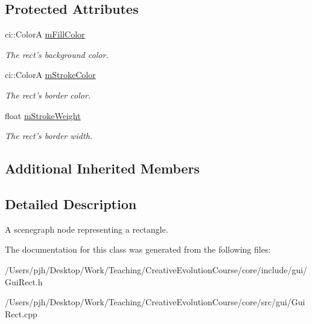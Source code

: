 \subsection*{Protected Attributes}
\begin{DoxyCompactItemize}
\item 
\hypertarget{class_gui_rect_a9c8999120a4fb5f654623195772a3988}{ci\-::\-Color\-A \hyperlink{class_gui_rect_a9c8999120a4fb5f654623195772a3988}{m\-Fill\-Color}}\label{class_gui_rect_a9c8999120a4fb5f654623195772a3988}

\begin{DoxyCompactList}\small\item\em The rect's background color. \end{DoxyCompactList}\item 
\hypertarget{class_gui_rect_a43b971fa2b7cf4afcfe476d693ba82a5}{ci\-::\-Color\-A \hyperlink{class_gui_rect_a43b971fa2b7cf4afcfe476d693ba82a5}{m\-Stroke\-Color}}\label{class_gui_rect_a43b971fa2b7cf4afcfe476d693ba82a5}

\begin{DoxyCompactList}\small\item\em The rect's border color. \end{DoxyCompactList}\item 
\hypertarget{class_gui_rect_a96f6a5cc17138bd803f22e4c4a180697}{float \hyperlink{class_gui_rect_a96f6a5cc17138bd803f22e4c4a180697}{m\-Stroke\-Weight}}\label{class_gui_rect_a96f6a5cc17138bd803f22e4c4a180697}

\begin{DoxyCompactList}\small\item\em The rect's border width. \end{DoxyCompactList}\end{DoxyCompactItemize}
\subsection*{Additional Inherited Members}


\subsection{Detailed Description}
A scenegraph node representing a rectangle. 

The documentation for this class was generated from the following files\-:\begin{DoxyCompactItemize}
\item 
/\-Users/pjh/\-Desktop/\-Work/\-Teaching/\-Creative\-Evolution\-Course/core/include/gui/Gui\-Rect.\-h\item 
/\-Users/pjh/\-Desktop/\-Work/\-Teaching/\-Creative\-Evolution\-Course/core/src/gui/Gui\-Rect.\-cpp\end{DoxyCompactItemize}

